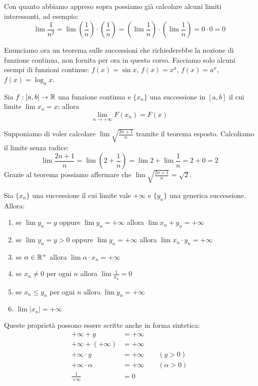 Con quanto abbiamo appreso sopra possiamo già calcolare alcuni limiti interessanti, ad esempio:
\begin{equation*}
\lim \frac{1}{n^2} = \lim \left(\frac{1}{n}\right)\cdot\left(\frac{1}{n}\right) = \left(\lim \frac{1}{n}\right)\cdot\left(\lim \frac{1}{n}\right) = 0 \cdot 0 = 0
\end{equation*}

Enunciamo ora un teorema sulle successioni che richiederebbe la nozione di funzione continua, non fornita per ora in questo corso. Facciamo solo alcuni esempi di funzioni continue: $f(x) = \sin x$, $f(x) = x^a$, $f(x) = a^x$, $f(x)=\log_a x$.
\begin{theorem}
Sia $f: [a, b] \rightarrow \mathbb R$ una funzione continua e $\{x_n\}$ una successione in $[a,b]$ il cui limite $\lim x_n = x$; allora 
\begin{equation*}
\lim_{n \to +\infty} F(x_n) = F(x)
\end{equation*}
\end{theorem}

Supponiamo di voler calcolare $\lim \sqrt{\frac{2n+1}{n}}$ tramite il teorema esposto. Calcoliamo il limite senza radice:
\begin{equation*}
\lim \frac{2n+1}{n} = \lim \left(2 + \frac{1}{n}\right) = \lim 2 + \lim \frac{1}{n} = 2 + 0 = 2
\end{equation*}
Grazie al teorema possiamo affermare che $\lim \sqrt{\frac{2n+1}{n}} = \sqrt{2}$.

\begin{theorem}
Sia $\{x_n\}$ una successione il cui limite vale $+\infty$ e $\{y_n\}$ una generica successione. Allora:
\begin{enumerate}
\item se $\lim y_n = y$ oppure $\lim y_n = +\infty$ allora $\lim x_n + y_n = +\infty$
\item se $\lim y_n = y > 0$ oppure $\lim y_n = +\infty$ allora $\lim x_n\cdot y_n = +\infty$
\item se $\alpha \in \mathbb R^+$ allora $\lim \alpha \cdot x_n = +\infty$
\item se $x_n \neq 0$ per ogni $n$ allora $\lim \frac{1}{x_n} = 0$
\item se $x_n \le y_n$ per ogni $n$ allora $\lim y_n = +\infty$
\item $\lim|x_n| = +\infty$
\end{enumerate}
\end{theorem}

Queste proprietà possono essere scritte anche in forma sintetica:
\begin{align*}
+\infty + y &= +\infty \\
+\infty + (+\infty) &= +\infty \\
+\infty \cdot y &= +\infty \qquad (y > 0) \\
+\infty \cdot \alpha &= +\infty \qquad (\alpha > 0) \\
\frac{1}{+\infty} &= 0
\end{align*}
